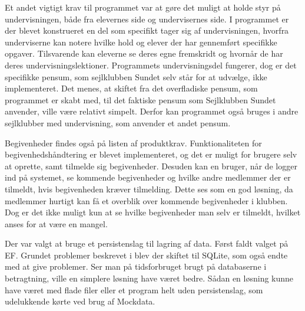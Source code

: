 Et andet vigtigt krav til programmet var at gøre det muligt at holde styr på undervisningen, både fra elevernes side og undervisernes side. 
I programmet er der blevet konstrueret en del som specifikt tager sig af undervisningen, hvorfra underviserne kan notere hvilke hold og elever der har gennemført specifikke opgaver.
Tilsvarende kan eleverne se deres egne fremskridt og hvornår de har deres undervisningslektioner.
Programmets undervisningsdel fungerer, dog er det specifikke pensum, som sejlklubben Sundet selv står for at udvælge, ikke implementeret. 
Det menes, at skiftet fra det overfladiske pensum, som programmet er skabt med, til det faktiske pensum som Sejlklubben Sundet anvender, ville være relativt simpelt. 
Derfor kan programmet også bruges i andre sejlklubber med undervisning, som anvender et andet pensum.

Begivenheder findes også på listen af produktkrav.
Funktionaliteten for begivenhedshåndtering er blevet implementeret, og det er muligt for brugere selv at oprette, samt tilmelde sig begivenheder.
Desuden kan en bruger, når de logger ind på systemet, se kommende begivenheder og hvilke andre medlemmer der er tilmeldt, hvis begivenheden kræver tilmelding. 
Dette ses som en god løsning, da medlemmer hurtigt kan få et overblik over kommende begivenheder i klubben.
Dog er det ikke muligt kun at se hvilke begivenheder man selv er tilmeldt, hvilket anses for at være en mangel. 

Der var valgt at bruge et persistenslag til lagring af data. 
Først faldt valget på \acl{EF}. 
Grundet problemer beskrevet i  blev der skiftet til SQLite, som også endte med at give problemer. 
Ser man på tidsforbruget brugt på databaserne i betragtning, ville en simplere løsning have været bedre.
Sådan en løsning kunne have været med flade filer eller et program helt uden persistenslag, som udelukkende kørte ved brug af Mockdata.  

